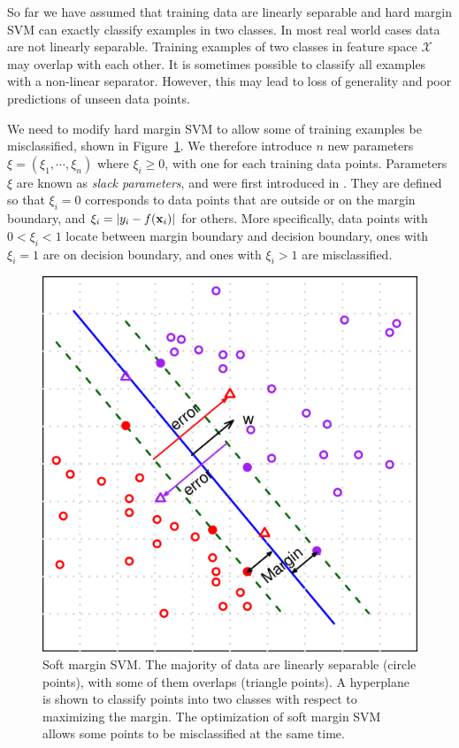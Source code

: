 \documentclass[english]{tktltiki}
\newcommand{\Xcal}{\mathcal{X}} %
\newcommand{\xb}{{\bf x}}
\begin{document}
So far we have assumed that training data are linearly separable and hard margin SVM can exactly classify examples in two classes. In most real world cases data are not linearly separable. Training examples of two classes in feature space $\Xcal$ may overlap with each other. It is sometimes possible to classify all examples with a non-linear separator. However, this may lead to loss of generality and poor predictions of unseen data points.

We need to modify hard margin SVM to allow some of training examples be misclassified, shown in Figure~\ref{soft_margin}. We therefore introduce $n$ new parameters $\xi = (\xi_1,\cdots,\xi_n)$ where $\xi_i \ge 0$, with one for each training data points. Parameters $\xi$ are known as {\em slack parameters}, and were first introduced in \cite{cortes95}. They are defined so that $\xi_i = 0$ corresponds to data points that are outside or on the margin boundary, and $\xi_i = |y_i - f(\xb_i)|$ for others. More specifically, data points with $0<\xi_i<1$ locate between margin boundary and decision boundary, ones with $\xi_i = 1$ are on decision boundary, and ones with $\xi_i>1$ are misclassified.

\begin{figure}[t]
\begin{center}
\centering
\includegraphics[width=0.60\columnwidth]{./plots/soft_margin.pdf}
\caption[Soft margin SVM.]{Soft margin SVM. The majority of data are linearly separable (circle points), with some of them overlaps (triangle points). A hyperplane is shown to classify points into two classes with respect to maximizing the margin. The optimization of soft margin SVM allows some points to be misclassified at the same time.}
\label{soft_margin}
\end{center}
\end{figure}
\end{document}
